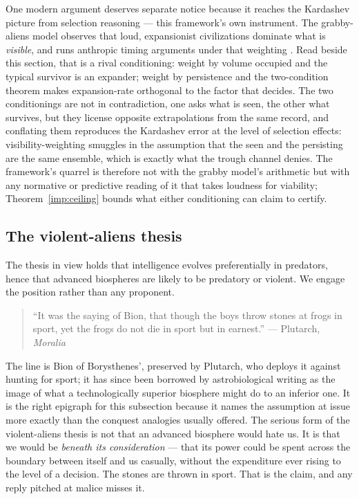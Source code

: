 \begin{remark}
\label{gr:rem:grabby}
One modern argument deserves separate notice because it reaches the
Kardashev picture from selection reasoning --- this framework's own
instrument. The grabby-aliens model observes that loud, expansionist
civilizations dominate what is \emph{visible}, and runs anthropic
timing arguments under that weighting \cite{HMMP21}. Read beside this
section, that is a rival conditioning: weight by volume occupied and
the typical survivor is an expander; weight by persistence and the
two-condition theorem makes expansion-rate orthogonal to the factor
that decides. The two conditionings are not in contradiction, one
asks what is seen, the other what survives, but they license
opposite extrapolations from the same record, and conflating them
reproduces the Kardashev error at the level of selection effects:
visibility-weighting smuggles in the assumption that the seen and the
persisting are the same ensemble, which is exactly what the trough
channel denies. The framework's quarrel is therefore not with the
grabby model's arithmetic but with any normative or predictive reading
of it that takes loudness for viability; Theorem~\ref{imp:ceiling} bounds
what either conditioning can claim to certify.
\end{remark}

\subsection{The violent-aliens thesis}\label{gr:subsub:violence}

The thesis in view holds that intelligence evolves preferentially in
predators, hence that advanced biospheres are likely to be predatory or
violent. We engage the position rather than any proponent.

\begin{quote}\small
``It was the saying of Bion, that though the boys throw stones at frogs
in sport, yet the frogs do not die in sport but in earnest.''
\hfill --- Plutarch, \emph{Moralia} \cite{Plutarch}
\end{quote}

\noindent The line is Bion of Borysthenes', preserved by Plutarch, who
deploys it against hunting for sport; it has since been borrowed by
astrobiological writing as the image of what a technologically superior
biosphere might do to an inferior one. It is the right epigraph for this
subsection because it names the assumption at issue more exactly than
the conquest analogies usually offered. The serious form of the
violent-aliens thesis is not that an advanced biosphere would hate us.
It is that we would be \emph{beneath its consideration} --- that its
power could be spent across the boundary between itself and us
casually, without the expenditure ever rising to the level of a
decision. The stones are thrown in sport. That is the claim, and any
reply pitched at malice misses it.

